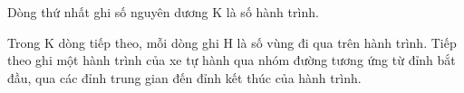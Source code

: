 Dòng thứ nhất ghi số nguyên dương K là số hành trình.  

   Trong K dòng tiếp theo, mỗi dòng ghi H là số vùng đi qua trên hành trình. Tiếp theo ghi một hành trình của xe tự hành qua nhóm đường tương ứng từ đỉnh bắt đầu, qua các đỉnh trung gian đến đỉnh kết thúc của hành trình.